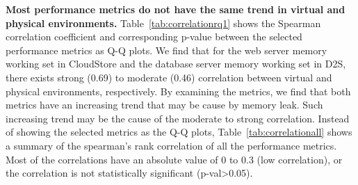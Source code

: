 \textbf{Most performance metrics do not have the same trend in virtual and physical environments.} Table~\ref{tab:correlationrq1} shows the Spearman correlation coefficient and corresponding p-value between the selected performance metrics as Q-Q plots. We find that for the web server memory working set in CloudStore and the database server memory working set in D2S, there exists strong (0.69) to moderate (0.46) correlation between virtual and physical environments, respectively. By examining the metrics, we find that both metrics have an increasing trend that may be cause by memory leak. Such increasing trend may be the cause of the moderate to strong correlation. Instead of showing the selected metrics as the Q-Q plots, Table~\ref{tab:correlationall} shows a summary of the spearman's rank correlation of all the performance metrics. Most of the correlations have an absolute value of 0 to 0.3 (low correlation), or the correlation is not statistically significant (p-val\textgreater0.05).






